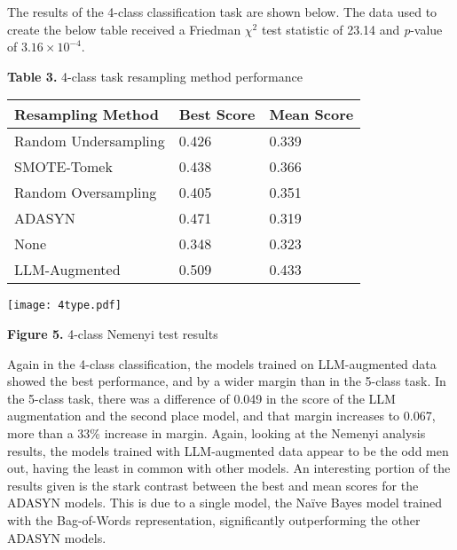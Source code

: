 \documentclass[runningheads]{llncs}
\newenvironment{nscenter}
 {\parskip=0pt\par\nopagebreak\centering}
 {\par\noindent\ignorespacesafterend}
\begin{document}
The results of the 4-class classification task are shown below. The data used to create the below table received a Friedman $\chi^2$ test statistic of 23.14 and \emph{p}-value of $3.16 \times 10^{-4}$.
\begin{nscenter}
{\bf Table 3.} 4-class task resampling method performance\\

\begin{tabular}{|l|l|l|}
\hline
Resampling Method & Best Score & Mean Score \\\hline
Random Undersampling & 0.426 & 0.339 \\\hline
SMOTE-Tomek & 0.438 & 0.366 \\\hline
Random Oversampling & 0.405 & 0.351 \\\hline
ADASYN & 0.471 & 0.319 \\\hline
None & 0.348 & 0.323 \\\hline
LLM-Augmented & 0.509 &  0.433 \\\hline
\end{tabular}

\texttt{[image: 4type.pdf]}

{\bf Figure 5.} 4-class Nemenyi test results
\end{nscenter}
Again in the 4-class classification, the models trained on LLM-augmented data showed the best performance, and by a wider margin than in the 5-class task. In the 5-class task, there was a difference of 0.049 in the score of the LLM augmentation and the second place model, and that margin increases to 0.067, more than a 33\% increase in margin. Again, looking at the Nemenyi analysis results, the models trained with LLM-augmented data appear to be the odd men out, having the least in common with other models. An interesting portion of the results given is the stark contrast between the best and mean scores for the ADASYN models. This is due to a single model, the Naïve Bayes model trained with the Bag-of-Words representation, significantly outperforming the other ADASYN models.
\end{document}
